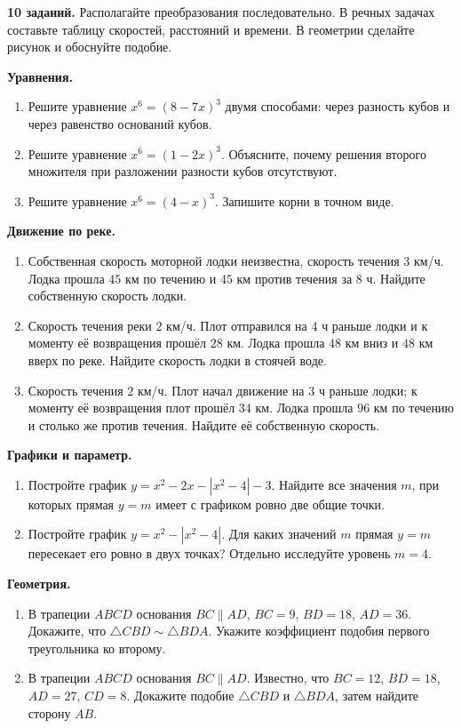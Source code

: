 \documentclass[a4paper,12pt]{article}
\newcommand{\sect}[1]{\par\vspace{2.5mm}{\Large\bfseries\color{darkaccent}#1}\par\vspace{1mm}{\color{accent!50}\rule{\linewidth}{.55pt}}\par\vspace{1mm}}
\begin{document}
\sect{6. Самостоятельная тренировка --- Путь А}
\textbf{10 заданий.} Располагайте преобразования последовательно. В речных задачах составьте таблицу скоростей, расстояний и времени. В геометрии сделайте рисунок и обоснуйте подобие.

\textbf{Уравнения.}
\begin{enumerate}[leftmargin=9mm,itemsep=4mm]
\item Решите уравнение $x^6=(8-7x)^3$ двумя способами: через разность кубов и через равенство оснований кубов.
\item Решите уравнение $x^6=(1-2x)^3$. Объясните, почему решения второго множителя при разложении разности кубов отсутствуют.
\item Решите уравнение $x^6=(4-x)^3$. Запишите корни в точном виде.
\end{enumerate}

\textbf{Движение по реке.}
\begin{enumerate}[start=4,leftmargin=9mm,itemsep=4mm]
\item Собственная скорость моторной лодки неизвестна, скорость течения $3$ км/ч. Лодка прошла $45$ км по течению и $45$ км против течения за $8$ ч. Найдите собственную скорость лодки.
\item Скорость течения реки $2$ км/ч. Плот отправился на $4$ ч раньше лодки и к моменту её возвращения прошёл $28$ км. Лодка прошла $48$ км вниз и $48$ км вверх по реке. Найдите скорость лодки в стоячей воде.
\item Скорость течения $2$ км/ч. Плот начал движение на $3$ ч раньше лодки; к моменту её возвращения плот прошёл $34$ км. Лодка прошла $96$ км по течению и столько же против течения. Найдите её собственную скорость.
\end{enumerate}

\textbf{Графики и параметр.}
\begin{enumerate}[start=7,leftmargin=9mm,itemsep=4mm]
\item Постройте график $y=x^2-2x-|x^2-4|-3$. Найдите все значения $m$, при которых прямая $y=m$ имеет с графиком ровно две общие точки.
\item Постройте график $y=x^2-|x^2-4|$. Для каких значений $m$ прямая $y=m$ пересекает его ровно в двух точках? Отдельно исследуйте уровень $m=4$.
\end{enumerate}

\textbf{Геометрия.}
\begin{enumerate}[start=9,leftmargin=9mm,itemsep=4mm]
\item В трапеции $ABCD$ основания $BC\parallel AD$, $BC=9$, $BD=18$, $AD=36$. Докажите, что $\triangle CBD\sim\triangle BDA$. Укажите коэффициент подобия первого треугольника ко второму.
\item В трапеции $ABCD$ основания $BC\parallel AD$. Известно, что $BC=12$, $BD=18$, $AD=27$, $CD=8$. Докажите подобие $\triangle CBD$ и $\triangle BDA$, затем найдите сторону $AB$.
\end{enumerate}
\clearpage
\end{document}
